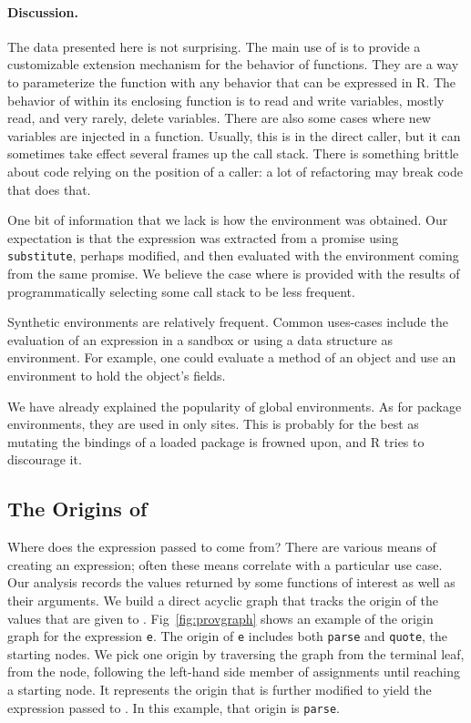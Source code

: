 \documentclass[acmsmall, screen]{acmart}
\renewcommand{\k}[1]{\lstinline |#1|\xspace}
\begin{document}
\paragraph{Discussion.}
The data presented here is not surprising. The main use of \eval is to provide a
customizable extension mechanism for the behavior of functions. They are a way
to parameterize the function with any behavior that can be expressed in R. The
behavior of \eval within its enclosing function is to read and write variables,
mostly read, and very rarely, delete variables. There are also some cases where
new variables are injected in a function. Usually, this is in the direct caller,
but it can sometimes take effect several frames up the call stack. There is
something brittle about code relying on the position of a caller: a lot of
refactoring may break code that does that.

One bit of information that we lack is how the environment was obtained. Our
expectation is that the expression was extracted from a promise using
\k{substitute}, perhaps modified, and then evaluated with the environment coming
from the same promise. We believe the case where \eval is provided with the results
of programmatically selecting some call stack to be less frequent.

Synthetic environments are relatively frequent. Common uses-cases include
the evaluation of an expression in a sandbox or using a data structure as
environment. For example, one could evaluate a method of an object and use an
environment to hold the object's fields.

We have already explained the popularity of global environments. As for package
environments, they are used in only \packageNbPackageNamespaceEnvSites sites.
This is probably for the best as mutating the bindings of a loaded package is
frowned upon, and R tries to discourage it.

\subsection{The Origins of \Eval}

Where does the expression passed to \eval come from? There are various means of
creating an expression; often these means correlate with a particular use case.
Our analysis records the values returned by some functions of interest as well
as their arguments. We build a direct acyclic graph that tracks the origin
of the values that are given to \eval. Fig~\ref{fig:provgraph} shows an example
of the origin graph for the expression \k{e}.
The origin of \k{e} includes both \k{parse} and \k{quote}, the starting nodes. We pick one origin by traversing the graph from the terminal leaf, \ie from the \eval node, following the left-hand side
member of assignments until reaching a starting node. It represents the origin that is
further modified to yield the expression passed to \eval. In this example, that
origin is \k{parse}.
\end{document}
